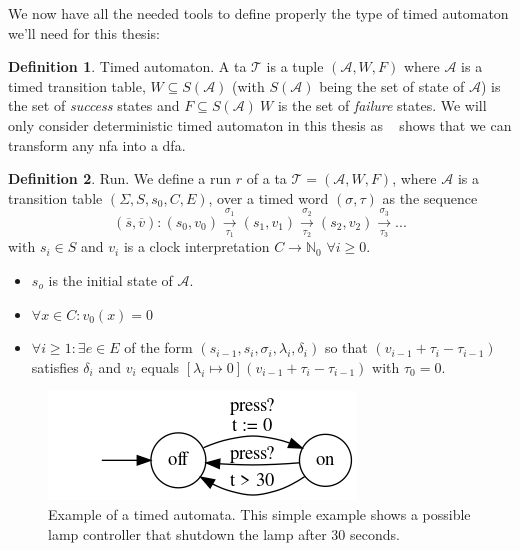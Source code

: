 \documentclass[12pt]{article}
\theoremstyle{definition}
\newtheorem{definition}{Definition}[section]
\theoremstyle{definition}
\newtheorem{example}{Example}[section]
\theoremstyle{remark}
\newcommand{\A}{\mathcal{A}}
\begin{document}
We now have all the needed tools to define properly the type of timed automaton we'll need for this thesis:

\theoremstyle{definition}
\begin{definition}{Timed automaton.} A \gls{ta} $\mathcal{T}$ is a tuple $(\A, W, F)$ where $\A$ is a timed transition table, $W \subseteq S(\A)$ (with $S(\A)$ being the set of state of $\A$) is the set of \textit{success} states and $F \subseteq S(\A) \ W$ is the set of \textit{failure} states. We will only consider deterministic timed automaton in this thesis as ~\cite{10.1007/3-540-63174-7_12} shows that we can transform any \gls{nfa} into a \gls{dfa}.
\end{definition}

\theoremstyle{definition}
\begin{definition}{Run.} We define a run $r$ of a \gls{ta} $\mathcal{T} = (\A, W, F)$, where $\A$ is a transition table $(\Sigma, S, s_{0},C, E)$, over a timed word $(\sigma, \tau)$ as the sequence
$$(\overline{s}, \overline{v}): (s_0, v_0) \xrightarrow[\tau_1]{\sigma_1} (s_1, v_1) \xrightarrow[\tau_2]{\sigma_2} (s_2, v_2) \xrightarrow[\tau_3]{\sigma_3} ...$$
with $s_i \in S$ and $v_i$ is a clock interpretation $C \to \mathbb{N}_0$ $\forall i \ge 0$.
\begin{itemize}
\item $s_o$ is the initial state of $\A$.
\item $\forall x \in C: v_0(x) = 0$
\item $\forall i \ge 1: \exists e \in E$ of the form $(s_{i-1}, s_i, \sigma_i, \lambda_i, \delta_i)$ so that $(v_{i-1} + \tau_i - \tau_{i-1})$ satisfies $\delta_i$ and $v_i$ equals $[\lambda_i \mapsto 0](v_{i-1} + \tau_i - \tau_{i-1})$ with $\tau_0 = 0$.~\cite{ALUR1994183}
\end{itemize}
\end{definition}

\begin{figure}
    \centering
    \includegraphics[scale=0.8]{timed_automata_lamp.png}
    \caption{Example of a timed automata. This simple example shows a possible lamp controller that shutdown the lamp after 30 seconds.}
    \label{timed_word}
\end{figure}
\end{document}
